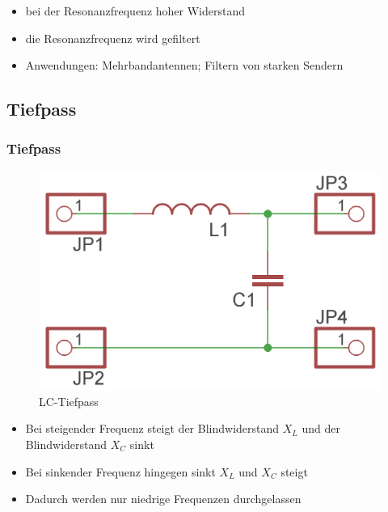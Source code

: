 \begin{frame}
\begin{center}
\begin{columns}
\begin{figure}
      \end{figure}
    \end{columns}
  \end{center}
  \pause
  \begin{itemize}
    \item bei der Resonanzfrequenz hoher Widerstand
    \item die Resonanzfrequenz wird gefiltert
    \item Anwendungen: Mehrbandantennen; Filtern von starken Sendern
  \end{itemize}
\end{frame}

\subsection*{Tiefpass}
\begin{frame}
  \frametitle{Tiefpass}
  \begin{center}
    \begin{figure}
      \includegraphics[width=\textwidth,height=.45\textheight,keepaspectratio]{e07/LC-Tiefpass.png}
      \caption{LC-Tiefpass}
    \end{figure}
  \end{center}
  \begin{itemize}
    \item Bei steigender Frequenz steigt der Blindwiderstand $X_L$ und der Blindwiderstand $X_C$ sinkt
    \item Bei sinkender Frequenz hingegen sinkt $X_L$ und $X_C$ steigt
    \item Dadurch werden nur niedrige Frequenzen durchgelassen
  \end{itemize}
\end{frame}

